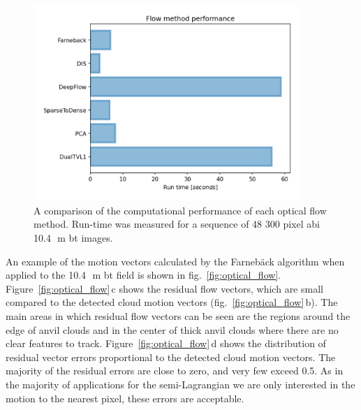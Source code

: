 \begin{figure}[tp]
    \includegraphics[width=0.9\textwidth]{figures/chapter1_13.png}
    \caption[
    A comparison of the computational performance of each optical flow method
    ]{
    A comparison of the computational performance of each optical flow method. Run-time was measured for a sequence of 48 300 pixel \acrshort{abi} 10.4\,\unit{\mu m} \acrshort{bt} images.
    }
    \label{fig:opt_flow_cost}
\end{figure}


An example of the motion vectors calculated by the Farnebäck algorithm when applied to the 10.4\,\unit{\mu m} \acrshort{bt} field is shown in fig.~\ref{fig:optical_flow}.
Figure~\ref{fig:optical_flow}\,c shows the residual flow vectors, which are small compared to the detected cloud motion vectors (fig.~\ref{fig:optical_flow}\,b).
The main areas in which residual flow vectors can be seen are the regions around the edge of anvil clouds and in the center of thick anvil clouds where there are no clear features to track.
Figure~\ref{fig:optical_flow}\,d shows the distribution of residual vector errors proportional to the detected cloud motion vectors.
The majority of the residual errors are close to zero, and very few exceed 0.5.
As in the majority of applications for the semi-Lagrangian we are only interested in the motion to the nearest pixel, these errors are acceptable.


